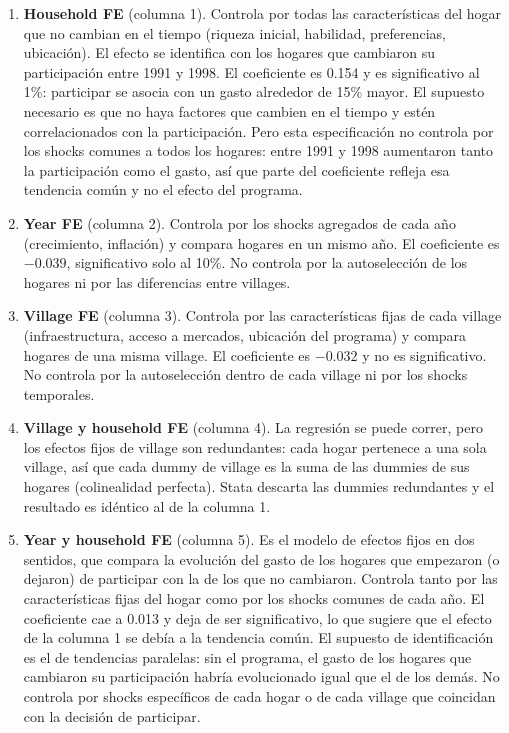 \documentclass[11pt,a4paper]{article}
\begin{document}
\begin{enumerate}[label=\alph*.]
  \item \textbf{Household FE} (columna 1). Controla por todas las características del hogar que no cambian en el tiempo (riqueza inicial, habilidad, preferencias, ubicación). El efecto se identifica con los hogares que cambiaron su participación entre 1991 y 1998. El coeficiente es 0.154 y es significativo al 1\%: participar se asocia con un gasto alrededor de 15\% mayor. El supuesto necesario es que no haya factores que cambien en el tiempo y estén correlacionados con la participación. Pero esta especificación no controla por los shocks comunes a todos los hogares: entre 1991 y 1998 aumentaron tanto la participación como el gasto, así que parte del coeficiente refleja esa tendencia común y no el efecto del programa.
  \item \textbf{Year FE} (columna 2). Controla por los shocks agregados de cada año (crecimiento, inflación) y compara hogares en un mismo año. El coeficiente es $-0.039$, significativo solo al 10\%. No controla por la autoselección de los hogares ni por las diferencias entre villages.
  \item \textbf{Village FE} (columna 3). Controla por las características fijas de cada village (infraestructura, acceso a mercados, ubicación del programa) y compara hogares de una misma village. El coeficiente es $-0.032$ y no es significativo. No controla por la autoselección dentro de cada village ni por los shocks temporales.
  \item \textbf{Village y household FE} (columna 4). La regresión se puede correr, pero los efectos fijos de village son redundantes: cada hogar pertenece a una sola village, así que cada dummy de village es la suma de las dummies de sus hogares (colinealidad perfecta). Stata descarta las dummies redundantes y el resultado es idéntico al de la columna 1.
  \item \textbf{Year y household FE} (columna 5). Es el modelo de efectos fijos en dos sentidos, que compara la evolución del gasto de los hogares que empezaron (o dejaron) de participar con la de los que no cambiaron. Controla tanto por las características fijas del hogar como por los shocks comunes de cada año. El coeficiente cae a 0.013 y deja de ser significativo, lo que sugiere que el efecto de la columna 1 se debía a la tendencia común. El supuesto de identificación es el de tendencias paralelas: sin el programa, el gasto de los hogares que cambiaron su participación habría evolucionado igual que el de los demás. No controla por shocks específicos de cada hogar o de cada village que coincidan con la decisión de participar.

\end{enumerate}
\end{document}
